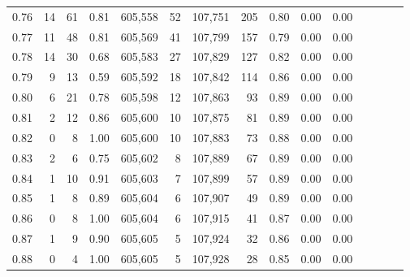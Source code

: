 \begin{tabular}{rrrcrrrrrrrrrrr}
0.76 &      14 &     61 &                                       0.81 &  605,558 &       52 &  107,751 &      205 &  0.80 &  0.00 &                         0.00 \\
0.77 &      11 &     48 &                                       0.81 &  605,569 &       41 &  107,799 &      157 &  0.79 &  0.00 &                         0.00 \\
0.78 &      14 &     30 &                                       0.68 &  605,583 &       27 &  107,829 &      127 &  0.82 &  0.00 &                         0.00 \\
0.79 &       9 &     13 &                                       0.59 &  605,592 &       18 &  107,842 &      114 &  0.86 &  0.00 &                         0.00 \\
0.80 &       6 &     21 &                                       0.78 &  605,598 &       12 &  107,863 &       93 &  0.89 &  0.00 &                         0.00 \\
0.81 &       2 &     12 &                                       0.86 &  605,600 &       10 &  107,875 &       81 &  0.89 &  0.00 &                         0.00 \\
0.82 &       0 &      8 &                                       1.00 &  605,600 &       10 &  107,883 &       73 &  0.88 &  0.00 &                         0.00 \\
0.83 &       2 &      6 &                                       0.75 &  605,602 &        8 &  107,889 &       67 &  0.89 &  0.00 &                         0.00 \\
0.84 &       1 &     10 &                                       0.91 &  605,603 &        7 &  107,899 &       57 &  0.89 &  0.00 &                         0.00 \\
0.85 &       1 &      8 &                                       0.89 &  605,604 &        6 &  107,907 &       49 &  0.89 &  0.00 &                         0.00 \\
0.86 &       0 &      8 &                                       1.00 &  605,604 &        6 &  107,915 &       41 &  0.87 &  0.00 &                         0.00 \\
0.87 &       1 &      9 &                                       0.90 &  605,605 &        5 &  107,924 &       32 &  0.86 &  0.00 &                         0.00 \\
0.88 &       0 &      4 &                                       1.00 &  605,605 &        5 &  107,928 &       28 &  0.85 &  0.00 &                         0.00 \\

\end{tabular}
